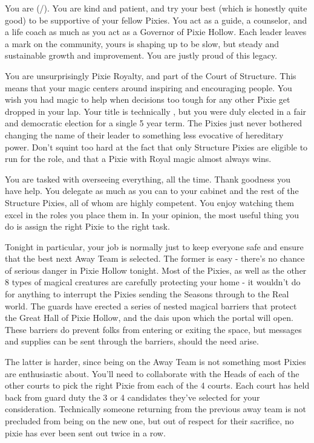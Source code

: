 \documentclass[char]{PP}
\begin{document}
\name{\cSHead{}}

You are \cSHead{} (\cSHead{\They}/\cSHead{\Them}). You are kind and patient, and try your best (which is honestly quite good) to be supportive of your fellow Pixies. You act as a guide, a counselor, and a life coach as much as you act as a Governor of Pixie Hollow. Each leader leaves a mark on the community, yours is shaping up to be slow, but steady and sustainable growth and improvement. You are justly proud of this legacy. 

You are unsurprisingly Pixie Royalty, and part of the Court of Structure. This means that your magic centers around inspiring and encouraging people. You wish you had magic to help when decisions too tough for any other Pixie get dropped in your lap. Your title is technically \cSHead{\Monarch}, but you were duly elected in a fair and democratic election for a single 5 year term. The Pixies just never bothered changing the name of their leader to something less evocative of hereditary power. Don't squint too hard at the fact that only Structure Pixies are eligible to run for the role, and that a Pixie with Royal magic almost always wins.

You are tasked with overseeing everything, all the time. Thank goodness you have help. You delegate as much as you can to your cabinet and the rest of the Structure Pixies, all of whom are highly competent. You enjoy watching them excel in the roles you place them in. In your opinion, the most useful thing you do is assign the right Pixie to the right task.

Tonight in particular, your job is normally just to keep everyone safe and ensure that the best next Away Team is selected. The former is easy - there's no chance of serious danger in Pixie Hollow tonight. Most of the Pixies, as well as the other 8 types of magical creatures are carefully protecting your home - it wouldn't do for anything to interrupt the Pixies sending the Seasons through to the Real world. The guards have erected a series of nested magical barriers that protect the Great Hall of Pixie Hollow, and the dais upon which the portal will open. These barriers do prevent folks from entering or exiting the space, but messages and supplies can be sent through the barriers, should the need arise.

The latter is harder, since being on the Away Team is not something most Pixies are enthusiastic about. You'll need to collaborate with the Heads of each of the other courts to pick the right Pixie from each of the 4 courts. Each court has held back from guard duty the 3 or 4 candidates they've selected for your consideration. Technically someone returning from the previous away team is not precluded from being on the new one, but out of respect for their sacrifice, no pixie has ever been sent out twice in a row.
\end{document}
